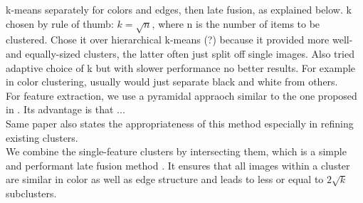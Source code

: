 k-means separately for colors and edges, then late fusion, as explained below. k chosen by rule of thumb: $ k = \sqrt{n} $, where n is the number of items to be clustered. Chose it over hierarchical k-means (?) because it provided more well- and equally-sized clusters, the latter often just split off single images.
Also tried adaptive choice of k but with slower performance no better results. For example in color clustering, usually would just separate black and white from others.\\
For feature extraction, we use a pyramidal appraoch similar to the one proposed in \cite{Lazebnik2006}. Its advantage is that ... \\
Same paper also states the appropriateness of this method especially in refining existing clusters.\\
We combine the single-feature clusters by intersecting them, which is a simple and performant late fusion method . It ensures that all images within a cluster are similar in color as well as edge structure and leads to less or equal to $ 2\sqrt{k} $ subclusters.
